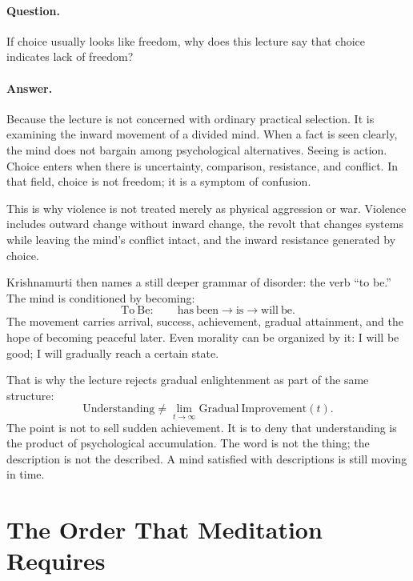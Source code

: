 \documentclass[11pt,oneside]{book}
\begin{document}
\paragraph{Question.}
If choice usually looks like freedom, why does this lecture say that choice indicates lack of freedom?

\paragraph{Answer.}
Because the lecture is not concerned with ordinary practical selection. It is examining the inward movement of a divided mind. When a fact is seen clearly, the mind does not bargain among psychological alternatives. Seeing is action. Choice enters when there is uncertainty, comparison, resistance, and conflict. In that field, choice is not freedom; it is a symptom of confusion.

This is why violence is not treated merely as physical aggression or war. Violence includes outward change without inward change, the revolt that changes systems while leaving the mind's conflict intact, and the inward resistance generated by choice.

Krishnamurti then names a still deeper grammar of disorder: the verb ``to be.'' The mind is conditioned by becoming:
\begin{equation}
\mathrm{To\ Be}:\qquad
\mathrm{has\ been} \longrightarrow \mathrm{is} \longrightarrow \mathrm{will\ be}.
\end{equation}
The movement carries arrival, success, achievement, gradual attainment, and the hope of becoming peaceful later. Even morality can be organized by it: I will be good; I will gradually reach a certain state.

That is why the lecture rejects gradual enlightenment as part of the same structure:
\begin{equation}
\mathrm{Understanding} \neq
\lim_{t\to\infty}\mathrm{Gradual\ Improvement}(t).
\end{equation}
The point is not to sell sudden achievement. It is to deny that understanding is the product of psychological accumulation. The word is not the thing; the description is not the described. A mind satisfied with descriptions is still moving in time.

\section{The Order That Meditation Requires}
\end{document}

